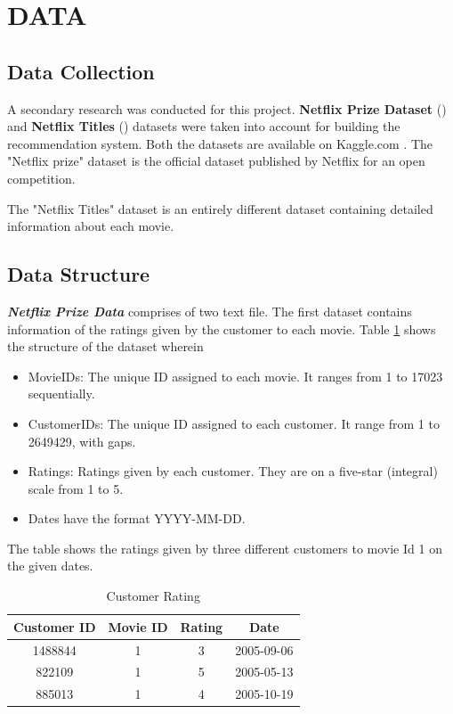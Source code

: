 \documentclass[a4paper,10pt]{article}
\begin{document}
\section{DATA}

\subsection{Data Collection}


A secondary research was conducted for this project.  \textbf{Netflix Prize Dataset} (\cite{netflix_prize_data})  and \textbf{Netflix Titles} (\cite{soeiro_n.d.}) datasets were taken into account for building the recommendation system. Both the datasets are available on Kaggle.com \cite{kaggle}. The "Netflix prize" dataset is the official dataset published by Netflix for an open competition. 

The "Netflix Titles" dataset is an entirely different dataset containing detailed information about each movie.

\subsection{Data Structure}

\textbf{\textit{Netflix Prize Data}} comprises of two text file. The first dataset contains information of the ratings given by the customer to each movie. Table \ref{Data_1} shows the structure of the dataset wherein 

\begin{itemize}
  \item MovieIDs: The unique ID assigned to each movie. It ranges from 1 to 17023 sequentially.
  \item CustomerIDs: The unique ID assigned to each customer. It range from 1 to 2649429, with gaps.
  \item Ratings: Ratings given by each customer. They are on a five-star (integral) scale from 1 to 5.
  \item Dates have the format YYYY-MM-DD.
\end{itemize}
The table shows the ratings given by three different customers to movie Id 1 on the given dates. 






\begin{table}
    \center 
    
    \begin{tabular}{|c|c|c|c|} \hline 
         Customer ID&  Movie ID&  Rating& Date\\ \hline 
         1488844&  1&  3& 2005-09-06
\\ \hline 
         822109&  1&  5& 2005-05-13
\\ \hline 
         885013&  1&  4& 2005-10-19
\\ \hline
    \end{tabular}
    \caption{Customer Rating}   
    \label{Data_1} 
\end{table}
\end{document}
